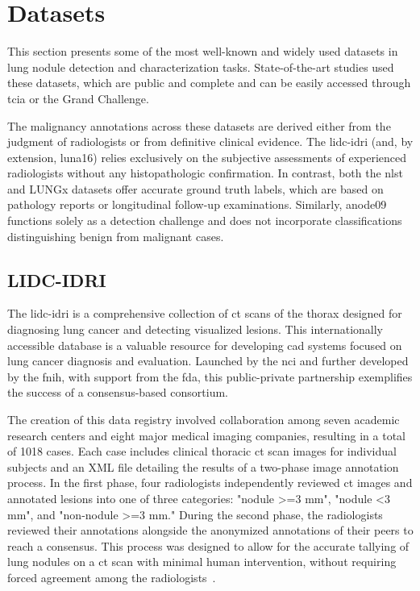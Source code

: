 \chapter{Datasets}
This section presents some of the most well-known and widely used datasets in lung nodule detection and characterization tasks. State-of-the-art studies used these datasets, which are public and complete and can be easily accessed through \ac{tcia} or the Grand Challenge.

The malignancy annotations across these datasets are derived either from the judgment of radiologists or from definitive clinical evidence. The \acs{lidc-idri} (and, by extension, \acs{luna16}) relies exclusively on the subjective assessments of experienced radiologists without any histopathologic confirmation. In contrast, both the \acs{nlst} and LUNGx datasets offer accurate ground truth labels, which are based on pathology reports or longitudinal follow-up examinations. Similarly, \acs{anode09} functions solely as a detection challenge and does not incorporate classifications distinguishing benign from malignant cases.

\section{LIDC-IDRI}\label{subsec:lidc}
The \ac{lidc-idri} is a comprehensive collection of \ac{ct} scans of the thorax designed for diagnosing lung cancer and detecting visualized lesions. This internationally accessible database is a valuable resource for developing \ac{cad} systems focused on lung cancer diagnosis and evaluation. Launched by the \ac{nci} and further developed by the \ac{fnih}, with support from the \ac{fda}, this public-private partnership exemplifies the success of a consensus-based consortium.

The creation of this data registry involved collaboration among seven academic research centers and eight major medical imaging companies, resulting in a total of 1018 cases. Each case includes clinical thoracic \ac{ct} scan images for individual subjects and an XML file detailing the results of a two-phase image annotation process. In the first phase, four radiologists independently reviewed \ac{ct} images and annotated lesions into one of three categories: "nodule >=3 mm", "nodule <3 mm", and "non-nodule >=3 mm." During the second phase, the radiologists reviewed their annotations alongside the anonymized annotations of their peers to reach a consensus. This process was designed to allow for the accurate tallying of lung nodules on a \ac{ct} scan with minimal human intervention, without requiring forced agreement among the radiologists~\cite{armato_iii_data_2015}.

